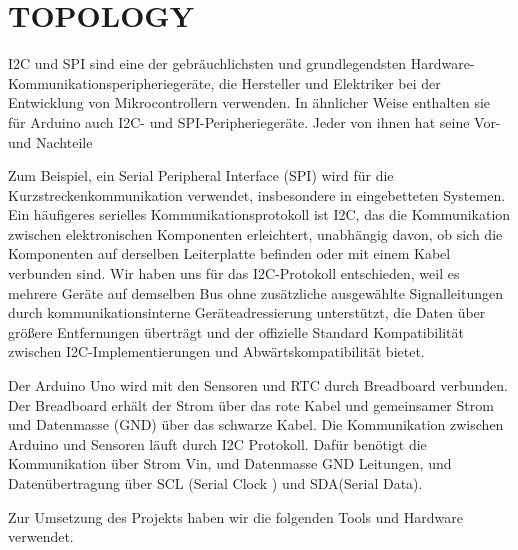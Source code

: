 \documentclass[conference]{IEEEtran}
\begin{document}
\section{TOPOLOGY }
I2C und SPI sind eine der gebräuchlichsten und grundlegendsten Hardware-Kommunikationsperipheriegeräte, die Hersteller und Elektriker bei der Entwicklung von Mikrocontrollern verwenden. In ähnlicher Weise enthalten sie für Arduino auch I2C- und SPI-Peripheriegeräte. Jeder von ihnen hat seine Vor- und Nachteile

Zum Beispiel, ein Serial Peripheral Interface (SPI) wird für die Kurzstreckenkommunikation verwendet, insbesondere in eingebetteten Systemen. Ein häufigeres serielles Kommunikationsprotokoll ist I2C, das die Kommunikation zwischen elektronischen Komponenten erleichtert, unabhängig davon, ob sich die Komponenten auf derselben Leiterplatte befinden oder mit einem Kabel verbunden sind.
Wir haben uns für das I2C-Protokoll entschieden, weil es mehrere Geräte auf demselben Bus ohne zusätzliche ausgewählte Signalleitungen durch kommunikationsinterne Geräteadressierung unterstützt, die Daten über größere Entfernungen überträgt und der offizielle Standard Kompatibilität zwischen I2C-Implementierungen und Abwärtskompatibilität bietet.

Der Arduino Uno wird mit den Sensoren und RTC durch Breadboard verbunden. Der Breadboard erhält der Strom über das rote Kabel und gemeinsamer Strom und Datenmasse (GND) über das schwarze Kabel.  Die Kommunikation zwischen Arduino und Sensoren läuft durch I2C Protokoll. Dafür benötigt die Kommunikation über Strom Vin, und Datenmasse GND Leitungen, und Datenübertragung über SCL (Serial Clock
) und SDA(Serial Data).  

Zur Umsetzung des Projekts haben wir die folgenden Tools und Hardware verwendet.
\end{document}
